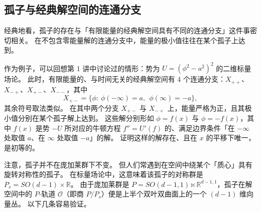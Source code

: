 

\subsection{孤子与经典解空间的连通分支}

经典地看，孤子的存在与「有限能量的经典解空间具有不同的连通分支」这件事密切相关。
在不包含零能量解的连通分支中，能量的极小值往往在某个孤子上达到。

作为例子，可以回想第 1 讲中讨论过的情形：势为 $U=(\phi^2-a^2)^2$ 的二维标量场论。
此时，有限能量的、与时间无关的经典解空间有 4 个连通分支：$X_{++}$、$X_{-+}$、$X_{+-}$、$X_{--}$，其中
\[
X_{+-}=\{\phi:\ \phi(-\infty)=a,\ \ \phi(\infty)=-a\},
\]
其余符号取法类似。
在其中两个分支 $X_{+-}$ 与 $X_{-+}$ 上，能量严格为正，且其极小值分别在某个孤子解上达到。
这些解分别形如 $\phi=f(x)$ 与 $\phi=-f(x)$，其中 $f(x)$ 是势 $-U$ 所对应的牛顿方程 $f''=U'(f)$ 的、满足边界条件「在 $-\infty$ 处取值 $a$、在 $\infty$ 处取值 $-a$」的解。
证明这样的解存在、且在 $x$ 的平移下唯一，是初等的。


注意，孤子并不在庞加莱群下不变。
但人们常遇到在空间中绕某个「质心」具有旋转对称性的孤子。
在标量场论中，这意味着该孤子的对称群是 $P_s=SO(d-1)\times\mathbb{R}$。
由于庞加莱群是 $P=SO(d-1,1)\ltimes\mathbb{R}^{d-1,1}$，孤子在解空间中的 $P$-轨道 $\mathcal{O}$（即商 $P/P_s$）便是上半个双叶双曲面上的一个 $(d-1)$ 维向量丛。
以下几条容易验证。

